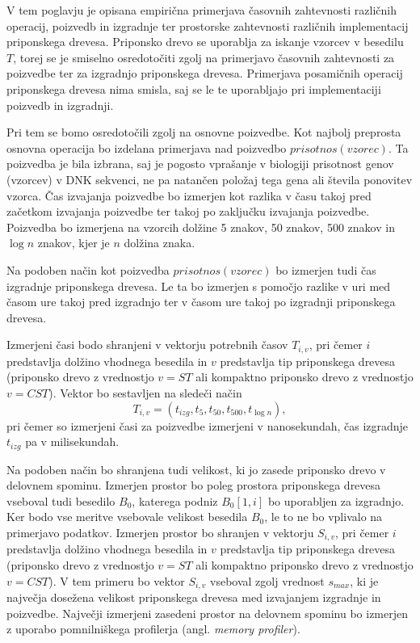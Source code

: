 

V tem poglavju je opisana empirična primerjava časovnih zahtevnosti različnih operacij, poizvedb in izgradnje ter prostorske zahtevnosti različnih implementacij priponskega drevesa. Priponsko drevo se uporablja za iskanje vzorcev v besedilu $T$, torej se je smiselno osredotočiti zgolj na primerjavo časovnih zahtevnosti za poizvedbe ter za izgradnjo priponskega drevesa. Primerjava posamičnih operacij priponskega drevesa nima smisla, saj se le te uporabljajo pri implementaciji poizvedb in izgradnji. 

Pri tem se bomo osredotočili zgolj na osnovne poizvedbe. Kot najbolj preprosta osnovna operacija bo izdelana primerjava nad poizvedbo $prisotnos(vzorec)$. Ta poizvedba je bila izbrana, saj je pogosto vprašanje v biologiji prisotnost genov (vzorcev) v DNK sekvenci, ne pa natančen položaj tega gena ali števila ponovitev vzorca. Čas izvajanja poizvedbe bo izmerjen kot razlika v času takoj pred začetkom izvajanja poizvedbe ter takoj po zaključku izvajanja poizvedbe. Poizvedba bo izmerjena na vzorcih dolžine 5 znakov, 50 znakov, 500 znakov in $\log{n}$ znakov, kjer je $n$ dolžina znaka. 

Na podoben način kot poizvedba $prisotnos(vzorec)$ bo izmerjen tudi čas izgradnje priponskega drevesa. Le ta bo izmerjen s pomočjo razlike v uri med časom ure takoj pred izgradnjo ter v časom ure takoj po izgradnji priponskega drevesa.

Izmerjeni časi bodo shranjeni v vektorju potrebnih časov $T_{i,v}$, pri čemer $i$ predstavlja dolžino vhodnega besedila in $v$ predstavlja tip priponskega drevesa (priponsko drevo z vrednostjo $v=ST$ ali kompaktno priponsko drevo z vrednostjo $v=CST$). Vektor bo sestavljen na sledeči način
\begin{equation*}
    T_{i,v}=(t_{izg},t_5,t_{50},t_{500},t_{\log{n}}),
\end{equation*}
pri čemer so izmerjeni časi za poizvedbe izmerjeni v nanosekundah, čas izgradnje $t_{izg}$ pa v milisekundah. 

Na podoben način bo shranjena tudi velikost, ki jo zasede priponsko drevo v delovnem spominu. Izmerjen prostor bo poleg prostora priponskega drevesa vseboval tudi besedilo $B_{0}$, katerega podniz $B_0[1,i]$ bo uporabljen za izgradnjo. Ker bodo vse meritve vsebovale velikost besedila $B_0$, le to ne bo vplivalo na primerjavo podatkov. Izmerjen prostor bo shranjen v vektorju $S_{i,v}$, pri čemer $i$ predstavlja dolžino vhodnega besedila in $v$ predstavlja tip priponskega drevesa (priponsko drevo z vrednostjo $v=ST$ ali kompaktno priponsko drevo z vrednostjo $v=CST$). V tem primeru bo vektor $S_{i,v}$ vseboval zgolj vrednost $s_{max}$, ki je največja dosežena velikost priponskega drevesa med izvajanjem izgradnje in poizvedbe. Največji izmerjeni zasedeni prostor na delovnem spominu bo izmerjen z uporabo pomnilniškega profilerja (angl. \textit{memory profiler}).

